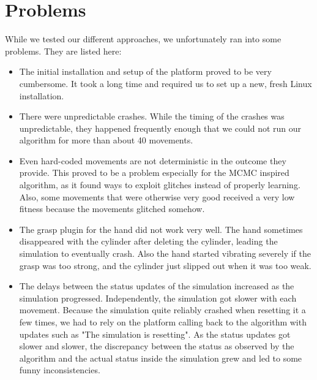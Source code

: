 \section{Problems} \label{sec:problems}

While we tested our different approaches, we unfortunately ran into some problems. They are listed here:
\begin{itemize}
	\item The initial installation and setup of the platform proved to be very cumbersome. It took a long time and required us to set up a new, fresh Linux installation.
	\item There were unpredictable crashes. While the timing of the crashes was unpredictable, they happened frequently enough that we could not run our algorithm for more than about 40 movements.
	\item Even hard-coded movements are not deterministic in the outcome they provide. This proved to be a problem especially for the MCMC inspired algorithm, as it found ways to exploit glitches instead of properly learning. Also, some movements that were otherwise very good received a very low fitness because the movements glitched somehow.
	\item The grasp plugin for the hand did not work very well. The hand sometimes disappeared with the cylinder after deleting the cylinder, leading the simulation to eventually crash. Also the hand started vibrating severely if the grasp was too strong, and the cylinder just slipped out when it was too weak.
	\item The delays between the status updates of the simulation increased as the simulation progressed. Independently, the simulation got slower with each movement. Because the simulation quite reliably crashed when resetting it a few times, we had to rely on the platform calling back to the algorithm with updates such as "The simulation is resetting". As the status updates got slower and slower, the discrepancy between the status as observed by the algorithm and the actual status inside the simulation grew and led to some funny inconsistencies.
\end{itemize}